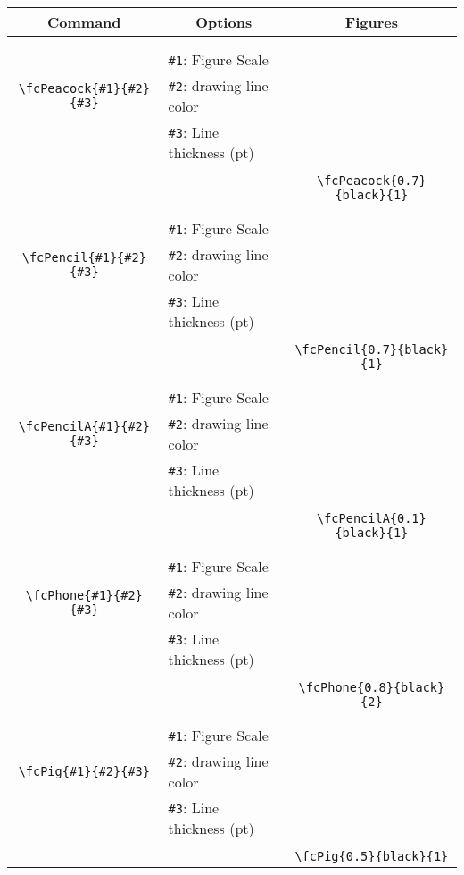 \documentclass{article}
\begin{document}
\begin{table}[H]\centering\begin{tabular}{|c|l|c|}\hline {\bf Command}& \multicolumn{1}{c|}{{\bf Options}} & {\bf Figures}\\  \hline	&&\multirow{5}{*}{\fcPeacock{0.7}{black}{1}}\\	&&\\	&\verb|#1|: Figure Scale &\\	\verb|\fcPeacock{#1}{#2}{#3}|&	\verb|#2|: drawing line color &\\	&\verb|#3|: Line thickness (pt) &\\ &&\\&&	\verb|\fcPeacock{0.7}{black}{1}|\\\hline 	
	&&\multirow{5}{*}{\fcPencil{0.7}{black}{1}}\\	&&\\	&\verb|#1|: Figure Scale &\\	\verb|\fcPencil{#1}{#2}{#3}|&	\verb|#2|: drawing line color &\\	&\verb|#3|: Line thickness (pt) &\\ &&\\&&	\verb|\fcPencil{0.7}{black}{1}|\\\hline 	
	&&\multirow{5}{*}{\fcPencilA{0.1}{black}{1}}\\	&&\\	&\verb|#1|: Figure Scale &\\	\verb|\fcPencilA{#1}{#2}{#3}|&	\verb|#2|: drawing line color &\\	&\verb|#3|: Line thickness (pt) &\\ &&\\&&	\verb|\fcPencilA{0.1}{black}{1}|\\\hline 	
	&&\multirow{5}{*}{\fcPhone{0.8}{black}{2}}\\	&&\\	&\verb|#1|: Figure Scale &\\	\verb|\fcPhone{#1}{#2}{#3}|&	\verb|#2|: drawing line color &\\	&\verb|#3|: Line thickness (pt) &\\ &&\\&&	\verb|\fcPhone{0.8}{black}{2}|\\\hline 	
	&&\multirow{5}{*}{\fcPig{0.5}{black}{1}}\\	&&\\	&\verb|#1|: Figure Scale &\\	\verb|\fcPig{#1}{#2}{#3}|&	\verb|#2|: drawing line color &\\	&\verb|#3|: Line thickness (pt) &\\ &&\\&&	\verb|\fcPig{0.5}{black}{1}|\\\hline 	

\end{tabular}
\end{table}
\end{document}
